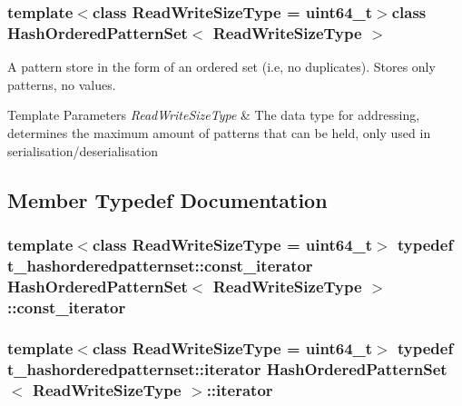 \subsubsection*{template$<$class Read\+Write\+Size\+Type = uint64\+\_\+t$>$class Hash\+Ordered\+Pattern\+Set$<$ Read\+Write\+Size\+Type $>$}

A pattern store in the form of an ordered set (i.\+e, no duplicates). Stores only patterns, no values. 


\begin{DoxyTemplParams}{Template Parameters}
{\em Read\+Write\+Size\+Type} & The data type for addressing, determines the maximum amount of patterns that can be held, only used in serialisation/deserialisation \\
\hline
\end{DoxyTemplParams}


\subsection{Member Typedef Documentation}
\hypertarget{classHashOrderedPatternSet_a5e1bbb1c4ef5ee0937bc0d5251a8d97e}{}
\subsubsection[{const\+\_\+iterator}]{\setlength{\rightskip}{0pt plus 5cm}template$<$class Read\+Write\+Size\+Type  = uint64\+\_\+t$>$ typedef t\+\_\+hashorderedpatternset\+::const\+\_\+iterator {\bf Hash\+Ordered\+Pattern\+Set}$<$ Read\+Write\+Size\+Type $>$\+::{\bf const\+\_\+iterator}}\label{classHashOrderedPatternSet_a5e1bbb1c4ef5ee0937bc0d5251a8d97e}
\hypertarget{classHashOrderedPatternSet_a3191eb8aa122dfe2bf819d37468bd0b6}{}
\subsubsection[{iterator}]{\setlength{\rightskip}{0pt plus 5cm}template$<$class Read\+Write\+Size\+Type  = uint64\+\_\+t$>$ typedef t\+\_\+hashorderedpatternset\+::iterator {\bf Hash\+Ordered\+Pattern\+Set}$<$ Read\+Write\+Size\+Type $>$\+::{\bf iterator}}\label{classHashOrderedPatternSet_a3191eb8aa122dfe2bf819d37468bd0b6}


